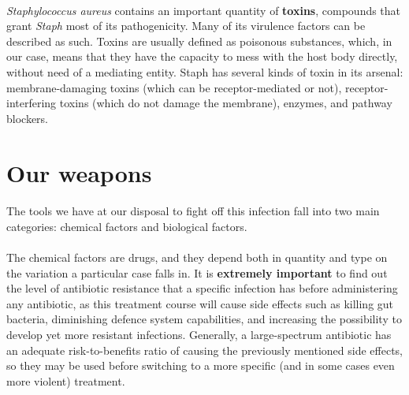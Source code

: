 \paragraph{}\emph{Staphylococcus aureus} contains an important quantity of \textbf{toxins}, compounds that grant \emph{Staph} most of its pathogenicity. Many of its virulence factors can be described as such. Toxins are usually defined as poisonous substances, which, in our case, means that they have the capacity to mess with the host body directly, without need of a mediating entity. Staph has several kinds of toxin in its arsenal: membrane-damaging toxins (which can be receptor-mediated or not), receptor-interfering toxins (which do not damage the membrane), enzymes, and pathway blockers.\newline
\section{Our weapons}
\paragraph{} The tools we have at our disposal to fight off this infection fall into two main categories: chemical factors and biological factors.
\paragraph{} The chemical factors are drugs, and they depend both in quantity and type on the variation a particular case falls in. It is \textbf{extremely important} to find out the level of antibiotic resistance that a specific infection has before administering any antibiotic, as this treatment course will cause side effects such as killing gut bacteria, diminishing defence system capabilities, and increasing the possibility to develop yet more resistant infections. Generally, a large-spectrum antibiotic has an adequate risk-to-benefits ratio of causing the previously mentioned side effects, so they may be used before switching to a more specific (and in some cases even more violent) treatment.
